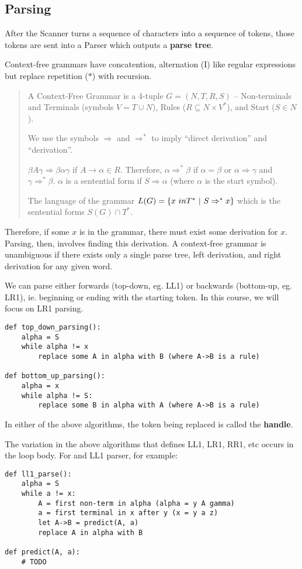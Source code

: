 \documentclass[12pt]{article}
\begin{document}
\subsection{Parsing}
After the Scanner turns a sequence of characters into a sequence of tokens, those tokens are sent into a Parser which outputs a {\bf parse tree}.

Context-free grammars have concatention, alternation (I) like regular expressions but replace repetition ($*$) with recursion.

\begin{quote}
A Context-Free Grammar is a 4-tuple $G = (N, T, R, S)$ -- Non-terminals and Terminals (symbols $V = T \cup N$), Rules ($R \subseteq N \times V^*$), and Start ($S \in N$).

We use the symbols $\Rightarrow$ and $\Rightarrow^*$ to imply ``direct derivation'' and ``derivation''.

$\beta A \gamma \Rightarrow \beta\alpha\gamma$ if $A \to \alpha \in R$. Therefore, $\alpha \Rightarrow^* \beta$ if $\alpha = \beta$ or $\alpha \Rightarrow \gamma$ and $\gamma \Rightarrow^* \beta$. $\alpha$ is a sentential form if $S \Rightarrow \alpha$ (where $\alpha$ is the start symbol).

The language of the grammar $L(G) = \{ x\ in T^* \suchthat S \Rightarrow^* x \}$ which is the sentential forms $S(G) \cap T^*$.
\end{quote}

Therefore, if some $x$ is in the grammar, there must exist some derivation for $x$. Parsing, then, involves finding this derivation. A context-free grammar is unambiguous if there exists only a single parse tree, left derivation, and right derivation for any given word.

We can parse either forwards (top-down, eg. LL1) or backwards (bottom-up, eg. LR1), ie. beginning or ending with the starting token. In this course, we will focus on LR1 parsing.

\begin{verbatim}
def top_down_parsing():
    alpha = S
    while alpha != x
        replace some A in alpha with B (where A->B is a rule)

def bottom_up_parsing():
    alpha = x
    while alpha != S:
        replace some B in alpha with A (where A->B is a rule)
\end{verbatim}

In either of the above algorithms, the token being replaced is called the {\bf handle}.

The variation in the above algorithms that defines LL1, LR1, RR1, etc occurs in the loop body. For and LL1 parser, for example:
\begin{verbatim}
def ll1_parse():
    alpha = S
    while a != x:
        A = first non-term in alpha (alpha = y A gamma)
        a = first terminal in x after y (x = y a z)
        let A->B = predict(A, a)
        replace A in alpha with B

def predict(A, a):
    # TODO
\end{verbatim}
\end{document}
